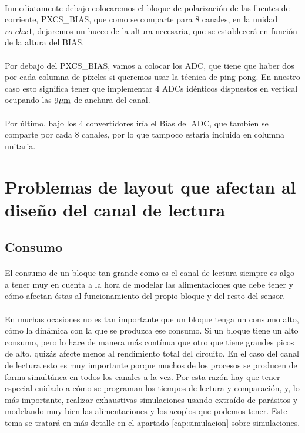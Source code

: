 \paragraph{}
Inmediatamente debajo colocaremos el bloque de polarización de las fuentes de
corriente, PXCS\_BIAS, que como se comparte para 8 canales, en la unidad $ro\_chx1$,
dejaremos un hueco de la altura necesaria, que se establecerá en función de la altura
del BIAS.

\paragraph{}
Por debajo del PXCS\_BIAS, vamos a colocar los ADC, que tiene que haber dos por
cada columna de píxeles si queremos usar la técnica de ping-pong. En nuestro caso
esto significa tener que implementar 4 ADCs idénticos dispuestos en vertical ocupando
las $9\mu\text{m}$ de anchura del canal.

\paragraph{}
Por último, bajo los 4 convertidores iría el Bias del ADC, que tambíen se comparte
por cada 8 canales, por lo que tampoco estaría incluida en columna unitaria.

\section{Problemas de layout que afectan al diseño del canal de lectura}

\subsection{Consumo}

\paragraph{}
El consumo de un bloque tan grande como es el canal de lectura siempre es algo a
tener muy en cuenta a la hora de modelar las alimentaciones que debe tener y
cómo afectan éstas al funcionamiento del propio bloque y del resto del sensor.

\paragraph{}
En muchas ocasiones no es tan importante que un bloque tenga un consumo alto,
cómo la dinámica con la que se produzca ese consumo. Si un bloque tiene un alto
consumo, pero lo hace de manera más contínua que otro que tiene grandes picos de
alto, quizás afecte menos al rendimiento total del circuito. En el caso del
canal de lectura esto es muy importante porque muchos de los procesos se producen
de forma simultánea en todos los canales a la vez. Por esta razón hay que tener
especial cuidado a cómo se programan los tiempos de lectura y comparación,
y, lo más importante, realizar exhaustivas simulaciones usando extraído de parásitos
y modelando muy bien las alimentaciones y los acoplos que podemos tener. Este tema
se tratará en más detalle en el apartado \ref{cap:simulacion} sobre simulaciones.

